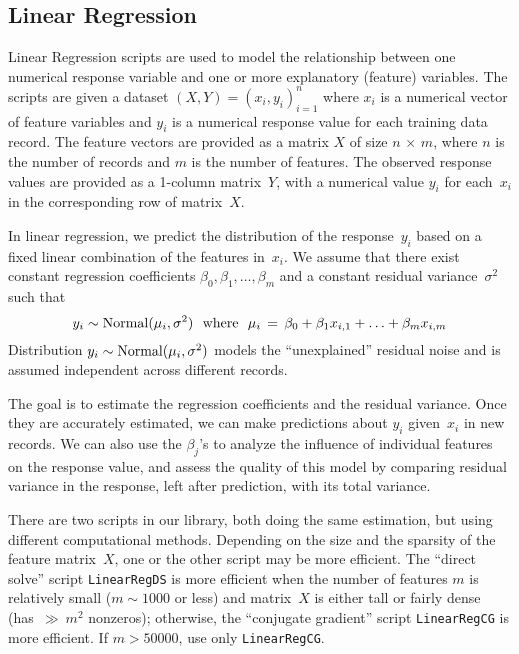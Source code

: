 \subsection{Linear Regression}

\smallskip

Linear Regression scripts are used to model the relationship between one numerical
response variable and one or more explanatory (feature) variables.
The scripts are given a dataset $(X, Y) = (x_i, y_i)_{i=1}^n$ where $x_i$ is a
numerical vector of feature variables and $y_i$ is a numerical response value for
each training data record.  The feature vectors are provided as a matrix $X$ of size
$n\,{\times}\,m$, where $n$ is the number of records and $m$ is the number of features.
The observed response values are provided as a 1-column matrix~$Y$, with a numerical
value $y_i$ for each~$x_i$ in the corresponding row of matrix~$X$.

In linear regression, we predict the distribution of the response~$y_i$ based on
a fixed linear combination of the features in~$x_i$.  We assume that
there exist constant regression coefficients $\beta_0, \beta_1, \ldots, \beta_m$
and a constant residual variance~$\sigma^2$ such that
\begin{equation}
y_i \sim \mathop{\mathrm{Normal}}\nolimits(\mu_i, \sigma^2) \,\,\,\,\textrm{where}\,\,\,\,
\mu_i \,=\, \beta_0 + \beta_1 x_{i,1} + \ldots + \beta_m x_{i,m}
\label{eqn:linregdef}
\end{equation}
Distribution $y_i \sim \mathop{\mathrm{Normal}}\nolimits(\mu_i, \sigma^2)$ models the ``unexplained'' residual
noise and is assumed independent across different records.

The goal is to estimate the regression coefficients and the residual variance.
Once they are accurately estimated, we can make predictions about $y_i$ given~$x_i$
in new records.  We can also use the $\beta_j$'s to analyze the influence of individual
features on the response value, and assess the quality of this model by comparing
residual variance in the response, left after prediction, with its total variance.

There are two scripts in our library, both doing the same estimation, but using different
computational methods.  Depending on the size and the sparsity of the feature matrix~$X$,
one or the other script may be more efficient.  The ``direct solve'' script
{\tt LinearRegDS} is more efficient when the number of features $m$ is relatively small
($m \sim 1000$ or less) and matrix~$X$ is either tall or fairly dense
(has~${\gg}\:m^2$ nonzeros); otherwise, the ``conjugate gradient'' script {\tt LinearRegCG}
is more efficient.  If $m > 50000$, use only {\tt LinearRegCG}.

